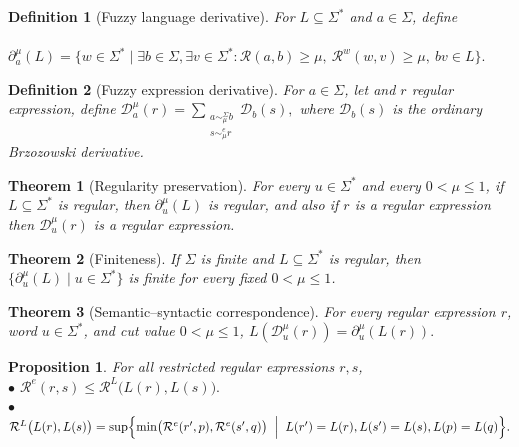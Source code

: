\documentclass{easychair}
\newtheorem{definition}{Definition}
\newtheorem{theorem}{Theorem}
\newtheorem{proposition}{Proposition}
\begin{document}
\begin{definition}[Fuzzy language derivative]
For $L\subseteq\Sigma^\ast$ and $a\in\Sigma$, define\\
\ \ \ \ $
\partial_a^\mu(L)
=
\{w\in\Sigma^\ast\mid
\exists b\in\Sigma,\exists v\in\Sigma^\ast:
\mathcal R(a,b)\ge\mu,\ 
\mathcal R^w(w,v)\ge\mu,\ 
bv\in L
\}.
$
\end{definition}
\begin{definition}[Fuzzy expression derivative]
For $a\in\Sigma$, let %
and $r$ regular expression, define
$\mathcal D_a^\mu(r)=\sum_{\substack{a\sim_\mu^\Sigma b\\ s\sim_\mu^e r}}\mathcal D_b(s),$
where $\mathcal D_b(s)$ is the ordinary Brzozowski derivative.
\end{definition}
\begin{theorem}[Regularity preservation] For every $u\in\Sigma^\ast$ and every $0<\mu\le1$, if $L\subseteq\Sigma^\ast$ is regular, then
$\partial_u^\mu(L)$ is regular, and also if $r$ is a regular expression then $\mathcal D_u^\mu(r)$ is a regular expression.
\end{theorem}

\begin{theorem}[Finiteness]\label{finiteness}
If $\Sigma$ is finite and $L\subseteq\Sigma^\ast$ is regular, then
$
\{\partial_u^\mu(L)\mid u\in\Sigma^\ast\}
$
is finite for every fixed $0<\mu\le1$.
\end{theorem}

\begin{theorem}[Semantic--syntactic correspondence]
For every regular expression $r$, word $u\in\Sigma^\ast$, and cut value
$0<\mu\le1$, $
L(\mathcal D_u^\mu(r))
=
\partial_u^\mu(L(r)).
$
\end{theorem}

\begin{proposition} For all restricted regular expressions $r,s$,\\
$\bullet$ 
$
\mathcal{R}^e(r,s)
\le
\mathcal{R}^L\bigl(L(r),L(s)\bigr).
$\\
$\bullet$ $\mathcal{R}^L\bigl(L(r),L(s)\bigr)
=
\sup\Bigl\{
\min\bigl(
\mathcal{R}^e(r',p),
\mathcal{R}^e(s',q)
\bigr)
\;\Bigm|\;%
L(r')=L(r),
L(s')=L(s),
L(p)=L(q)
\Bigr\}.$
\end{proposition}
\end{document}
